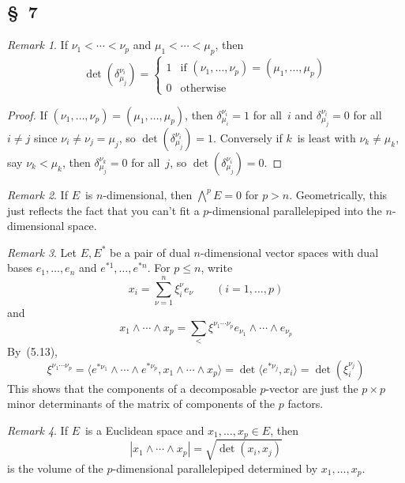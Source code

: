 \documentclass[letterpaper,12pt]{article}
\newcommand{\eprod}{\wedge}
\newcommand{\bigeprod}{\bigwedge}
\newcommand{\medeprod}{{\textstyle\bigeprod}}
\newcommand{\sprod}[2]{\langle#1,#2\rangle}
\newcommand{\iprod}[2]{(#1,#2)}
\newcommand{\norm}[1]{|#1|}
\newcommand{\multi}[4]{#2_{#3}#1\cdots#1#2_{#4}}
\newcommand{\eprods}[3]{\multi{\eprod}{#1}{#2}{#3}}
\theoremstyle{definition}
\theoremstyle{remark}
\newtheorem*{rmk}{Remark}
\begin{document}
\subsection*{\S~7}
\begin{rmk}
If \(\nu_1<\cdots<\nu_p\) and \(\mu_1<\cdots<\mu_p\), then
\[\det(\delta^{\nu_i}_{\mu_j})=\begin{cases}
1&\text{if }(\nu_1,\ldots,\nu_p)=(\mu_1,\ldots,\mu_p)\\
0&\text{otherwise}
\end{cases}\]
\end{rmk}
\begin{proof}
If \((\nu_1,\ldots,\nu_p)=(\mu_1,\ldots,\mu_p)\), then \(\delta^{\nu_i}_{\mu_i}=1\) for all~\(i\) and \(\delta^{\nu_i}_{\mu_j}=0\) for all \(i\ne j\) since \(\nu_i\ne\nu_j=\mu_j\), so \(\det(\delta^{\nu_i}_{\mu_j})=1\). Conversely if \(k\)~is least with \(\nu_k\ne\mu_k\), say \(\nu_k<\mu_k\), then \(\delta^{\nu_k}_{\mu_j}=0\) for all~\(j\), so \(\det(\delta^{\nu_i}_{\mu_j})=0\).
\end{proof}

\begin{rmk}
If \(E\)~is \(n\)-dimensional, then \(\medeprod^p E=0\) for \(p>n\). Geometrically, this just reflects the fact that you can't fit a \(p\)-dimensional parallelepiped into the \(n\)-dimensional space.
\end{rmk}

\begin{rmk}
Let \(E,E^*\) be a pair of dual \(n\)-dimensional vector spaces with dual bases \(e_1,\ldots,e_n\) and \(e^{*1},\ldots,e^{*n}\). For \(p\le n\), write
\[x_i=\sum_{\nu=1}^n\xi_i^{\nu}e_{\nu}\qquad(i=1,\ldots,p)\]
and
\[\eprods{x}{1}{p}=\sum_{<}\xi^{\nu_1\cdots\nu_p}\eprods{e}{\nu_1}{\nu_p}\]
By~(5.13),
\[\xi^{\nu_1\cdots\nu_p}=\sprod{e^{*\nu_1}\eprod\cdots\eprod e^{*\nu_p}}{\eprods{x}{1}{p}}=\det\sprod{e^{*\nu_j}}{x_i}=\det(\xi_i^{\nu_j})\]
This shows that the components of a decomposable \(p\)-vector are  just the \(p\times p\) minor determinants of the matrix of components of the \(p\) factors.
\end{rmk}

\begin{rmk}
If \(E\)~is a Euclidean space and \(x_1,\ldots,x_p\in E\), then
\[\norm{\eprods{x}{1}{p}}=\sqrt{\det\iprod{x_i}{x_j}}\]
is the volume of the \(p\)-dimensional parallelepiped determined by \(x_1,\ldots,x_p\).
\end{rmk}
\end{document}
